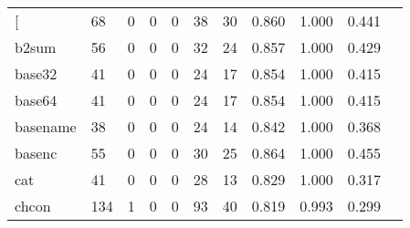 \begin{longtable}{lp{1.10cm}p{1.10cm}p{1.10cm}p{1.10cm}p{1.10cm}p{1.10cm}p{1.10cm}p{1.10cm}p{1.10cm}p{1.10cm}}
\bottomrule
\endlastfoot
{[}         &                     68 &                                  0 &                                 0 &                                0 &                                38 &                              30 &                          0.860 &                                 1.000 &                               0.441 \\
b2sum     &                     56 &                                  0 &                                 0 &                                0 &                                32 &                              24 &                          0.857 &                                 1.000 &                               0.429 \\
base32    &                     41 &                                  0 &                                 0 &                                0 &                                24 &                              17 &                          0.854 &                                 1.000 &                               0.415 \\
base64    &                     41 &                                  0 &                                 0 &                                0 &                                24 &                              17 &                          0.854 &                                 1.000 &                               0.415 \\
basename  &                     38 &                                  0 &                                 0 &                                0 &                                24 &                              14 &                          0.842 &                                 1.000 &                               0.368 \\
basenc    &                     55 &                                  0 &                                 0 &                                0 &                                30 &                              25 &                          0.864 &                                 1.000 &                               0.455 \\
cat       &                     41 &                                  0 &                                 0 &                                0 &                                28 &                              13 &                          0.829 &                                 1.000 &                               0.317 \\
chcon     &                    134 &                                  1 &                                 0 &                                0 &                                93 &                              40 &                          0.819 &                                 0.993 &                               0.299 \\

\end{longtable}
